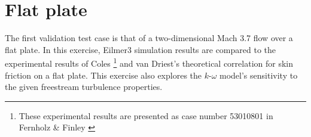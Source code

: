 \newpage
\section{Flat plate}
\label{chapter-flat-plate}
%
The first validation test case is that of a two-dimensional Mach 3.7
flow over a flat plate. In this exercise, Eilmer3 simulation results are compared to
the experimental results of Coles \cite{Coles1953} \footnote{These experimental
results are presented as case number 53010801 in Fernholz \& Finley 
\cite{Fernholz1977}} and van Driest's \cite{vanDriest1956} theoretical correlation 
for skin friction on a flat plate. This exercise also explores the $k$-$\omega$ 
model's sensitivity to the given freestream turbulence properties.

